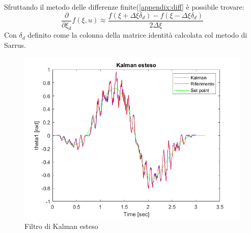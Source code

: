Sfruttando il metodo delle differenze finite(\ref{appendix:diff} è possibile trovare:
\begin{equation}
\frac{\partial}{\partial \xi_d} f(\xi,u) \approx \frac{f(\xi+\Delta\xi\delta_d)-f(\xi-\Delta\xi\delta_d)}{2\Delta\xi}
\end{equation}
Con $\delta_d$ definito come la colonna della matrice identità calcolata col metodo di Sarrus.
\begin{figure}[ht]
	\begin{center}
		\includegraphics[scale=0.52]{Immagini/Kalman2}
		\caption{Filtro di Kalman esteso}
		\label{fig:kalmanek}
	\end{center}
\end{figure}